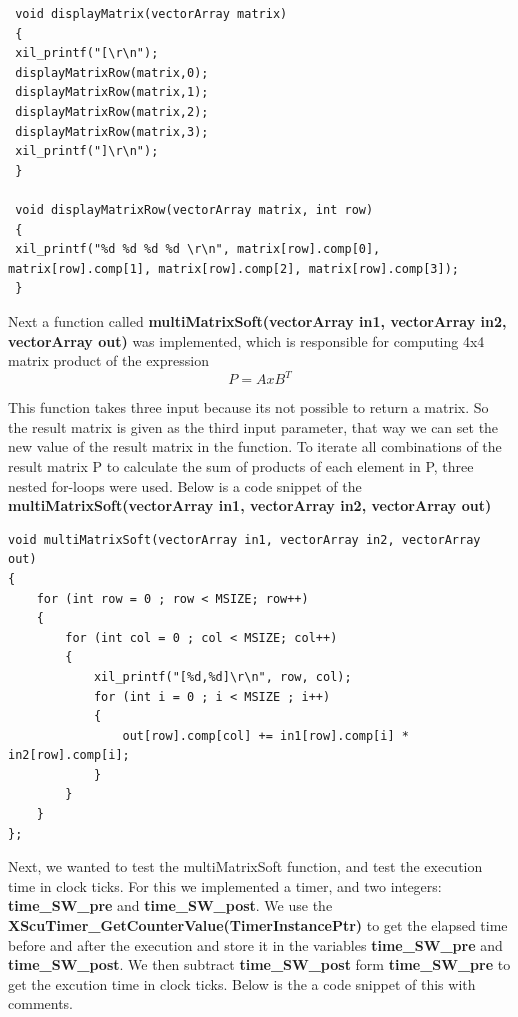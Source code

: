  \begin{lstlisting}
 void displayMatrix(vectorArray matrix)
 {
 xil_printf("[\r\n");
 displayMatrixRow(matrix,0);
 displayMatrixRow(matrix,1);
 displayMatrixRow(matrix,2);
 displayMatrixRow(matrix,3);
 xil_printf("]\r\n");
 }
 
 void displayMatrixRow(vectorArray matrix, int row)
 {
 xil_printf("%d %d %d %d \r\n", matrix[row].comp[0], matrix[row].comp[1], matrix[row].comp[2], matrix[row].comp[3]);
 }
 \end{lstlisting}
 
 Next a function called \textbf{multiMatrixSoft(vectorArray in1, vectorArray in2, vectorArray out)} was implemented, which is responsible for computing 4x4 matrix product of the expression \[ P = A x B^T \]
 
This function takes three input because its not possible to return a matrix. So the result matrix is given as the third input parameter, that way we can set the new value of the result matrix in the function. To iterate all combinations of the result matrix P to calculate the sum of products of each element in P, three nested for-loops were used. 
Below is a code snippet of the \textbf{multiMatrixSoft(vectorArray in1, vectorArray in2, vectorArray out)}

 \begin{lstlisting}
void multiMatrixSoft(vectorArray in1, vectorArray in2, vectorArray out)
{
	for (int row = 0 ; row < MSIZE; row++)
	{
		for (int col = 0 ; col < MSIZE; col++)
		{
			xil_printf("[%d,%d]\r\n", row, col);
			for (int i = 0 ; i < MSIZE ; i++)
			{
				out[row].comp[col] += in1[row].comp[i] * in2[row].comp[i];
			}
		}
	}
};
\end{lstlisting}

Next, we wanted to test the multiMatrixSoft function, and test the execution time in clock ticks. For this we implemented a timer, and two integers: \textbf{time\_SW\_pre} and \textbf{time\_SW\_post}. We use the \textbf{XScuTimer\_GetCounterValue(TimerInstancePtr)} to get the elapsed time before and after the execution and store it in the variables \textbf{time\_SW\_pre} and \textbf{time\_SW\_post}. We then subtract \textbf{time\_SW\_post} form \textbf{time\_SW\_pre} to get the excution time in clock ticks. Below is the a code snippet of this with comments. 


